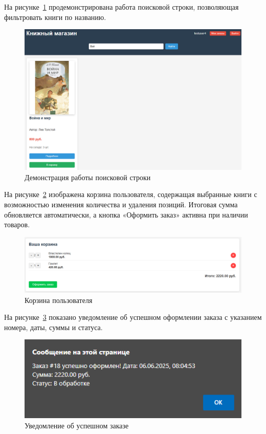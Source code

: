На рисунке~\ref{fig:screenshot5} продемонстрирована работа поисковой строки, позволяющая фильтровать книги по названию.
\begin{figure}[H]
	\centering
	\includegraphics[width=0.8\linewidth]{images/Screenshot_5}
	\caption{Демонстрация работы поисковой строки}
	\label{fig:screenshot5}
\end{figure}

На рисунке~\ref{fig:cart} изображена корзина пользователя, содержащая выбранные книги с возможностью изменения количества и удаления позиций. Итоговая сумма обновляется автоматически, а кнопка «Оформить заказ» активна при наличии товаров.
\begin{figure}[H]
	\centering
	\includegraphics[width=0.9\linewidth]{images/корзинка}
	\caption{Корзина пользователя}
	\label{fig:cart}
\end{figure}

На рисунке~\ref{fig:order_success} показано уведомление об успешном оформлении заказа с указанием номера, даты, суммы и статуса.
\begin{figure}[H]
	\centering
	\includegraphics[width=0.7\linewidth]{images/заказсделан}
	\caption{Уведомление об успешном заказе}
	\label{fig:order_success}
\end{figure}

